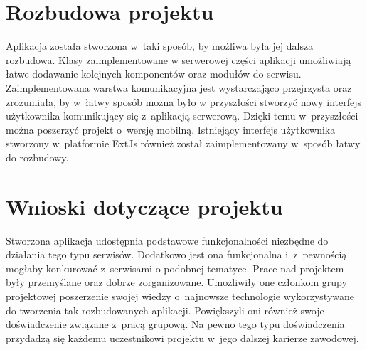 \section{Rozbudowa projektu}

Aplikacja została stworzona w~taki sposób, by możliwa była jej dalsza rozbudowa. Klasy zaimplementowane w serwerowej części aplikacji umożliwiają łatwe dodawanie kolejnych komponentów oraz modułów do serwisu. Zaimplementowana warstwa komunikacyjna jest wystarczająco przejrzysta oraz zrozumiała, by w~łatwy sposób można było w przyszłości stworzyć nowy interfejs użytkownika komunikujący się z~aplikacją serwerową. Dzięki temu w~przyszłości można poszerzyć projekt o~wersję mobilną.
Istniejący interfejs użytkownika stworzony w~platformie ExtJs również został zaimplementowany w~sposób łatwy do rozbudowy.

\section{Wnioski dotyczące projektu}

Stworzona aplikacja udostępnia podstawowe funkcjonalności niezbędne do działania tego typu serwisów. Dodatkowo jest ona funkcjonalna i~z~pewnością mogłaby konkurować z~serwisami o podobnej tematyce. 
Prace nad projektem były przemyślane oraz dobrze zorganizowane. Umożliwiły one członkom grupy projektowej poszerzenie swojej wiedzy o~najnowsze technologie wykorzystywane do tworzenia tak rozbudowanych aplikacji. Powiększyli oni również swoje doświadczenie związane z~pracą grupową. 
Na pewno tego typu doświadczenia przydadzą się każdemu uczestnikowi projektu w~jego dalszej karierze zawodowej.